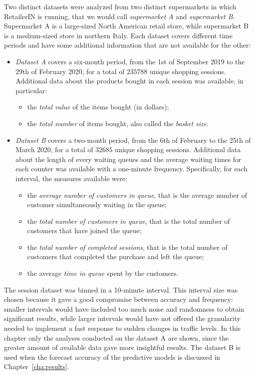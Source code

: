 Two distinct datasets were analyzed from two distinct supermarkets in which RetailerIN is running, that we would call \emph{supermarket A} and \emph{supermarket B}. Supermarket A is a large-sized North American retail store, while supermarket B is a medium-sized store in northern Italy. Each dataset covers different time periods and have some additional information that are not available for the other:
\begin{itemize}
  \item \emph{Dataset A} covers a six-month period, from the 1st of September 2019 to the 29th of February 2020, for a total of \( 235788 \) unique shopping sessions. Additional data about the products bought in each session was available, in particular:
        \begin{itemize}
          \item the \emph{total value} of the items bought (in dollars);
          \item the \emph{total number} of items bought, also called the \emph{basket size}.
        \end{itemize}
  \item \emph{Dataset B} covers a two-month period, from the 6th of February to the 25th of March 2020, for a total of \( 32685 \) unique shopping sessions. Additional data about the length of every waiting queues and the average waiting times for each counter was available with a one-minute frequency. Specifically, for each interval, the measures available were:
        \begin{itemize}
          \item the \emph{average number of customers in queue}, that is the average number of customer simultaneously waiting in the queue;
          \item the \emph{total number of customers in queue}, that is the total number of customers that have joined the queue;
          \item the \emph{total number of completed sessions}, that is the total number of customers that completed the purchase and left the queue;
          \item the average \emph{time in queue} spent by the customers.
        \end{itemize}
\end{itemize}

The session dataset was binned in a 10-minute interval. This interval size was chosen because it gave a good compromise between accuracy and frequency: smaller intervals would have included too much noise and randomness to obtain significant results, while larger intervals would have not offered the granularity needed to implement a fast response to sudden changes in traffic levels. In this chapter only the analyses conducted on the dataset A are shown, since the greater amount of available data gave more insightful results. The dataset B is used when the forecast accuracy of the predictive models is discussed in Chapter~\ref{cha:results}.

